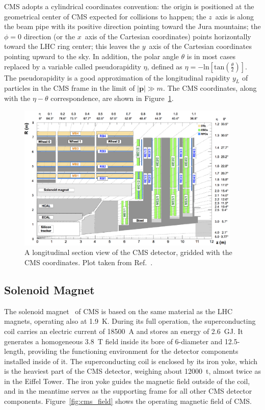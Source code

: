 CMS adopts a cylindrical coordinates convention: the origin is positioned at the geometrical center of CMS expected for collisions to happen;
the $z$~axis is along the beam pipe with its positive direction pointing toward the Jura mountains;
the $\phi = 0$ direction (or the $x$~axis of the Cartesian coordinates) points horizontally toward the LHC ring center;
this leaves the $y$~axis of the Cartesian coordinates pointing upward to the sky.
In addition, the polar angle $\theta$ is in most cases replaced by a variable called pseudorapidity $\eta$, 
defined as $\eta = -\text{ln}[\text{tan}(\frac{\theta}{2})]$.
The pseudorapidity is a good approximation of the longitudinal rapidity $y_{L}$ of particles in the CMS frame in the limit of $|\textbf{p}| \gg m$.
The CMS coordinates, along with the $\eta - \theta$ correspondence, are shown in Figure~\ref{fig:cms_longitudinal}.

\begin{figure}[!htb]
    \centering
    \includegraphics[width=0.95\textwidth]{pics/LHC_CMS/CMS_longitudinal.png}
    \caption{A longitudinal section view of the CMS detector, gridded with the CMS coordinates.
             Plot taken from Ref.~\cite{Sirunyan_2018}.}
    \label{fig:cms_longitudinal}
\end{figure}


\subsection{Solenoid Magnet}\label{sec:magnet}

The solenoid magnet~\cite{Collaboration_2008} of CMS is based on the same material as the LHC magnets, operating also at 1.9~K.
During its full operation, the superconducting coil carries an electric current of 18500~A and stores an energy of 2.6~GJ.
It generates a homogeneous 3.8~T field inside its bore of 6-\meter diameter and 12.5-\meter length,
providing the functioning environment for the detector components installed inside of it.
The superconducting coil is enclosed by its iron yoke, which is the heaviest part of the CMS detector, 
weighing about 12000~t, almost twice as in the Eiffel Tower.
The iron yoke guides the magnetic field outside of the coil, and in the meantime serves as the supporting frame for all other CMS detector components.
Figure~\ref{fig:cms_field} shows the operating magnetic field of CMS.

